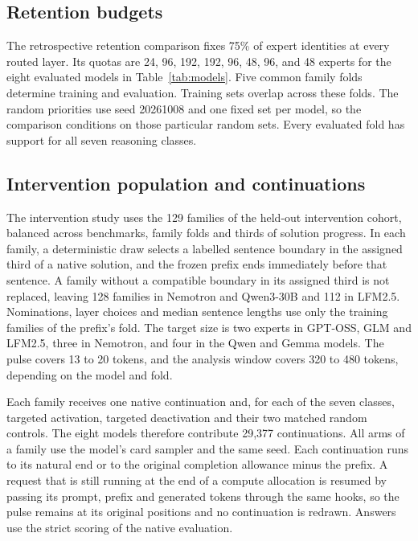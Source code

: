 \subsection{Retention budgets}

The retrospective retention comparison fixes 75\% of expert identities at every routed layer.
%
Its quotas are 24, 96, 192, 192, 96, 48, 96, and 48 experts for the eight evaluated models in Table~\ref{tab:models}.
%
Five common family folds determine training and evaluation.
%
Training sets overlap across these folds.
%
The random priorities use seed 20261008 and one fixed set per model, so the comparison conditions on those particular random sets.
%
Every evaluated fold has support for all seven reasoning classes.
%

\subsection{Intervention population and continuations}
\label{sec:intervention-setup}

The intervention study uses the 129 families of the held-out intervention cohort, balanced across benchmarks, family folds and thirds of solution progress.
%
In each family, a deterministic draw selects a labelled sentence boundary in the assigned third of a native solution, and the frozen prefix ends immediately before that sentence.
%
A family without a compatible boundary in its assigned third is not replaced, leaving 128 families in Nemotron and Qwen3-30B and 112 in LFM2.5.
%
Nominations, layer choices and median sentence lengths use only the training families of the prefix's fold.
%
The target size is two experts in GPT-OSS, GLM and LFM2.5, three in Nemotron, and four in the Qwen and Gemma models.
%
The pulse covers 13 to 20 tokens, and the analysis window covers 320 to 480 tokens, depending on the model and fold.
%

Each family receives one native continuation and, for each of the seven classes, targeted activation, targeted deactivation and their two matched random controls.
%
The eight models therefore contribute 29,377 continuations.
%
All arms of a family use the model's card sampler and the same seed.
%
Each continuation runs to its natural end or to the original completion allowance minus the prefix.
%
A request that is still running at the end of a compute allocation is resumed by passing its prompt, prefix and generated tokens through the same hooks, so the pulse remains at its original positions and no continuation is redrawn.
%
Answers use the strict scoring of the native evaluation.
%

